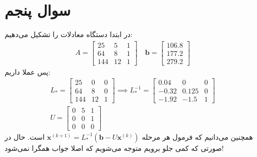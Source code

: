 \documentclass[]{article}
\begin{document}
\section*{سوال پنجم}
در ابتدا دستگاه معادلات را تشکیل می‌دهیم:
\begin{gather*}
    A = \begin{bmatrix}
        25 & 5 & 1\\
        64 & 8 & 1\\
        144 & 12 & 1
    \end{bmatrix}
    \quad
    \mathbf{b} = \begin{bmatrix}
        106.8\\
        177.2\\
        279.2
    \end{bmatrix}
\end{gather*}
پس عملا داریم:
\begin{gather*}
    L_* = \begin{bmatrix}
        25 & 0 & 0\\
        64 & 8 & 0\\
        144 & 12 & 1
    \end{bmatrix}
    \implies
    L_*^{-1} = \begin{bmatrix}
        0.04 & 0 & 0\\
        -0.32 & 0.125 & 0\\
        -1.92 & -1.5 & 1
    \end{bmatrix}
    \\
    U = \begin{bmatrix}
        0 & 5 & 1\\
        0 & 0 & 1\\
        0 & 0 & 0
    \end{bmatrix}
\end{gather*}
همچنین می‌دانیم که فرمول هر مرحله
$\mathbf{x}^{(k+1)} = L_*^{-1} (\mathbf{b} - U \mathbf{x}^{(k)})$
است. حال در صورتی که کمی جلو برویم متوجه می‌شویم که
اصلا جواب همگرا نمی‌شود!
\end{document}
